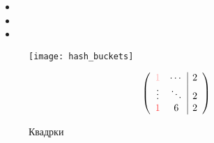 \begin{itemize}
\setlength{\itemindent}{0.25in}
    \item
    \item
    \item
\end{itemize}







\begin{figure}[h]
\texttt{[image: hash\_buckets]}
\centering
\end{figure}






\begin{figure}[ht]
  \centering
$$
\left(
\begin{array}{cc|c}
\color{red!30}{1} & \cdots & 2 \\ 
\vdots & \ddots & 2 \\
\color{red!70}{1} & 6 & 2 \\ 
\end{array}
\right)
$$
\caption{Квадрки}
\label{fig:quadr}
\endminipage
\end{figure}





\fi

